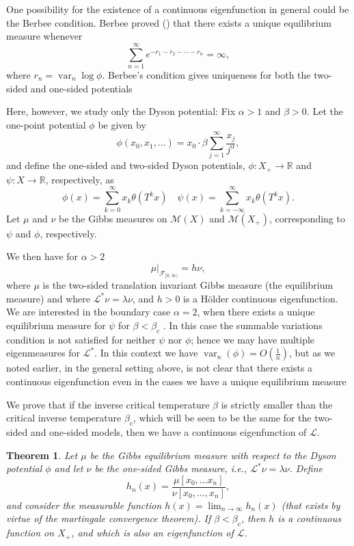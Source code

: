 \documentclass[11pt, a4paper]{amsart}
\newtheorem{thm}{Theorem}
\theoremstyle{definition}
\theoremstyle{remark}
\providecommand{\RR}{\mathbb{R}}
\providecommand{\CM}{\mathscr{M}}
\providecommand{\opn}{\operatorname}
\providecommand{\var}{\opn{var}}
\def\X{X}
\begin{document}
One possibility for the existence of a continuous eigenfunction in general could be the Berbee condition.
Berbee proved (\cite{berbee89}) that there exists a
unique equilibrium measure whenever
\begin{equation}\label{berbee}
  \sum_{n=1}^\infty e^{-r_1-r_2-\cdots-r_n}=\infty,    
\end{equation}
where $r_n=\var_n \log \phi$. Berbee's condition
gives uniqueness for both the two-sided and
one-sided potentials

Here, however, we study only the Dyson potential: Fix $\alpha>1$ and $\beta>0$. Let the one-point potential $\phi$ be given by
$$\phi(x_0, x_1,\ldots)=x_0\cdot \beta \sum_{j=1}^\infty \frac{x_j}{j^\alpha},$$
and define the one-sided and two-sided 
Dyson potentials, $\phi:\X_+\to \RR$ and $\psi:\X\to\RR$, respectively, as 
$$
\phi(x)=\sum_{k=0}^\infty x_k \theta (T^k x) \quad
\psi(x)=\sum_{k=-\infty}^\infty x_k \theta(T^k x).
$$
Let $\mu$ and $\nu$ be the Gibbs measures on $\CM(\X)$ and $\CM(\X_+)$, corresponding to $\psi$ and $\phi$, respectively.  

We then have for $\alpha>2$
$$\mu\vert_{{\mathcal F}_{[0,\infty)}}= h\nu,$$
where $\mu$ is the two-sided translation invariant Gibbs measure (the
equilibrium measure) and where ${\mathcal L}^*\nu=\lambda \nu$, and $h>0$ is a
H\"older continuous eigenfunction. We are interested in the boundary case
$\alpha=2$, when there exists a unique equilibrium measure for $\psi$ for
$\beta<\beta_c$ \cite{ACCN}. In this case the summable variations condition is not satisfied
for neither $\psi$ nor $\phi$; hence we may have multiple eigenmeasures for
${\mathcal L}^*$. In this context we have $\var_n(\phi)=O(\frac{1}{n})$, but as we noted earlier, in the general setting above, is not clear that there exists a continuous eigenfunction even in the cases we have a unique
equilibrium measure

We prove that if the inverse critical temperature $\beta$ is strictly smaller than the critical inverse temperature $\beta_c$, which will be seen to be the same for the two-sided and one-sided models, then we have a continuous eigenfunction of ${\mathcal L}$.

\begin{thm}\label{main} Let $\mu$ be the Gibbs equilibrium measure with respect
to the Dyson potential $\phi$ and let $\nu$ be the one-sided Gibbs measure,
i.e., ${\mathcal L}^*\nu=\lambda \nu$. Define
$$h_n(x)=\frac{\mu[x_0,\ldots x_n]}{\nu[x_0,\ldots, x_n]},$$
and consider the measurable function $h(x)=\lim_{n\to \infty}h_n(x)$ (that exists by virtue of the martingale convergence theorem). If $\beta<\beta_c$, then $h$ is a continuous function on $X_+$, and which is also
an eigenfunction of ${\mathcal L}$.
\end{thm}
\end{document}
